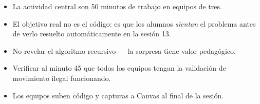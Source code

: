 \documentclass[12pt, oneside]{article}
\begin{document}
\begin{recuerda}
\begin{itemize}
  \item La actividad central son 50 minutos de trabajo en equipos de tres.
  \item El objetivo real no es el código: es que los alumnos \textit{sientan}
        el problema antes de verlo resuelto automáticamente en la sesión 13.
  \item No revelar el algoritmo recursivo — la sorpresa tiene valor pedagógico.
  \item Verificar al minuto 45 que todos los equipos tengan la validación
        de movimiento ilegal funcionando.
  \item Los equipos suben código y capturas a Canvas al final de la sesión.
\end{itemize}
\end{recuerda}
\end{document}
